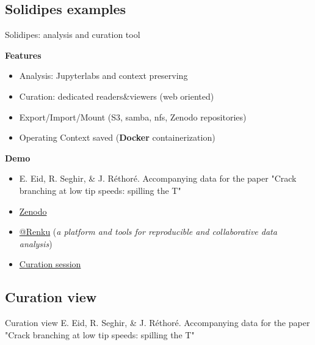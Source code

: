 \documentclass[10pt,compress,serif,aspectratio=169]{beamer}
\begin{document}
\subsection{Solidipes examples}
\begin{frame}{ Solidipes: analysis and curation tool}

\begin{minipage}{.6\textwidth}
  \textbf{Features}
\begin{itemize}
  \item Analysis: Jupyterlabs and context preserving
  \item Curation: dedicated readers\&viewers (web oriented)
  \item Export/Import/Mount (S3, samba, nfs, Zenodo repositories)
  \item Operating Context saved (\textbf{Docker} containerization)
\end{itemize}
\vfill
\textbf{Demo}
\begin{itemize}
  \item {\footnotesize E. Eid, R. Seghir, \& J. Réthoré. Accompanying data for the paper "Crack branching at low tip speeds: spilling the T"}
\item \href{https://doi.org/10.5281/zenodo.8256346}{Zenodo}
\item \href{https://renkulab.io/projects/guillaume.anciaux/jtcam-data-10172}{@Renku} (\textit{a platform and tools for reproducible and collaborative data analysis})
\item \href{https://renkulab.io/projects/guillaume.anciaux/jtcam-data-10172/sessions/new?autostart=1}{Curation session}
\end{itemize}
\end{minipage}
\begin{minipage}{.39\textwidth}
\end{minipage}
\end{frame}

\subsection{Curation view}
\begin{frame}{Curation view}
{E. Eid, R. Seghir, \& J. Réthoré. Accompanying data for the paper "Crack branching at low tip speeds: spilling the T"}
    
\end{frame}


\end{document}
